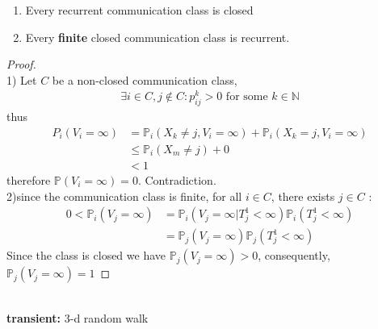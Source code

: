 \begin{corollary}\quad
	\begin{enumerate}
		\item Every recurrent communication class is closed
		\item Every \textbf{finite} closed communication class is recurrent.
	\end{enumerate}
\end{corollary}
\begin{proof}\quad\\
	1) Let $C$ be a non-closed communication class, 
	\begin{align*}
		\exists i \in C, j\notin C: p_{ij}^k > 0 \text{ for some $k \in \mathbb{N}$}
	\end{align*}
	thus
	\begin{align*}
		P_i(V_i = \infty) &= \mathbb{P}_i(X_k \neq j, V_i = \infty) + \mathbb{P}_i(X_k = j, V_i = \infty)\\
		&\le \mathbb{P}_i(X_m \neq j) + 0\\
		&< 1
	\end{align*}
	therefore $\mathbb{P}(V_i = \infty) = 0$. Contradiction.\\
		2)since the communication class is finite, for all $i \in C$,  there exists $j \in C$ :
	\begin{align*}
		0<\mathbb{P}_i(V_j = \infty) &= \mathbb{P}_i(V_j = \infty|T_j^1 < \infty) \mathbb{P}_i(T_j^1 < \infty)\\
		&= \mathbb{P}_j(V_j = \infty)\mathbb{P}_j(T_j^1 < \infty)
	\end{align*}
	Since the class is closed we have $\mathbb{P}_j(V_j = \infty) > 0$, consequently, $\mathbb{P}_j(V_j = \infty) = 1$ 
\end{proof}

\begin{example}
	\quad\\
	\textbf{transient:} 3-d random walk
\end{example}


